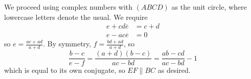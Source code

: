 We proceed using complex numbers with $(ABCD)$ as the unit circle, where lowercase letters denote the usual. We require
\begin{align*}
e+cd\overline{e} &= c+d \\
e-ac\overline{e} &= 0
\end{align*}
so $e=\frac{ac+ad}{a+d}$. By symmetry, $f=\frac{bd+ad}{a+d}$, so
\[
\frac{b-c}{e-f}=\frac{(a+d)(b-c)}{ac-bd}=\frac{ab-cd}{ac-bd}-1
\]
which is equal to its own conjugate, so $EF\parallel BC$ as desired.
